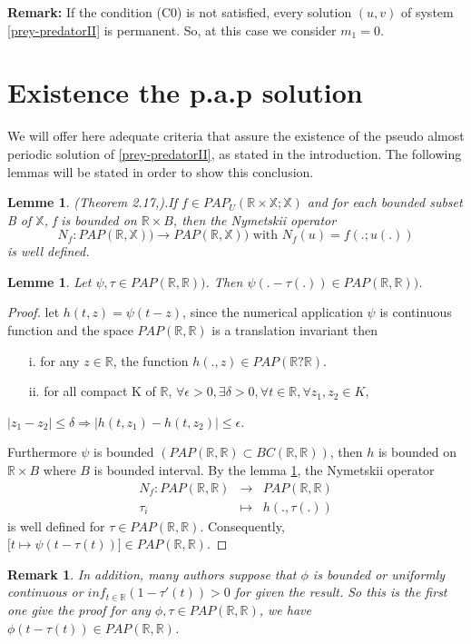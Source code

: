 \documentclass[[a4paper,10pt]{article}
\newcommand{\X}{\mathbb{X}}
\newcommand{\R}{\mathbb{R}}
\newtheorem{lemma}[theorem]{Lemme}%
\newtheorem{remark}[theorem]{Remark}%
\begin{document}
\textbf{Remark:} If the condition (C0) is not satisfied, every solution $(u,v)$ of system \eqref{prey-predatorII} is permanent. So, at this case we consider $m_1=0.$



\section{Existence  the p.a.p solution}
\hspace{1cm} We will offer here adequate criteria that assure the existence  of the pseudo almost periodic solution of \eqref{prey-predatorII}, as stated in the introduction. The following lemmas will be stated in order to show this conclusion.
\begin{lemma} (Theorem 2.17,\cite{cieutat2010composition}).\label{NymetskiiPAP} If $f\in PAP_U(\R\times  \X;\X)$ and for each bounded subset B of $\X$, f is bounded
on $\R\times B$, then the Nymetskii operator
$$N_f : PAP(\R,\X) )\rightarrow PAP(\R,\X)) \text{ with }N_f (u) = f(.; u(.))$$
is well defined.
\end{lemma}
\begin{lemma}\label{composepap}
 Let $\psi,\tau \in PAP(\R,\R))$.  Then $\psi(.-\tau(.)) \in PAP(\R,\R))$. 
\end{lemma}
\begin{proof}
let  $h(t,z)=\psi(t-z)$,  since the numerical application $\psi$ is continuous function  and the space $PAP(\R,\R)$ is a translation invariant then \begin{enumerate}
\item[i.] for any $z\in \R$, the function $h(.,z) \in PAP(\R? \R)$. 
\item[ ii.] for all compact K of $\R$, $\forall \epsilon> 0, \exists \delta > 0, \forall t \in \mathbb{R}, \forall z_1, z_2 \in K$,\end{enumerate}
\begin{center}
$|z_1 - z_2| \leq \delta \Rightarrow  |h(t, z_1) - h(t, z_2)| \leq \epsilon$.
\end{center}
Furthermore $\psi$ is bounded $(PAP(\R,\R)\subset BC(\R,\R))$, then $h$ is bounded on $\R\times B $ where $B$ is bounded interval. 
By the lemma \ref{NymetskiiPAP}, the Nymetskii operator
\begin{eqnarray*}
 N_f : PAP(\R,\R)&\longrightarrow & PAP(\R,\R)
 \\\tau_i &\longmapsto &h(.,\tau(.))\end{eqnarray*}
is well defined for ${\displaystyle \tau \in  PAP(\R,\mathbb{R})}$. Consequently, ${\displaystyle \bigg[t\longmapsto\psi(t-\tau(t))\bigg]\in  PAP(\R,\mathbb{R})}.$
\end{proof}
\begin{remark}
In addition, many authors suppose that $\phi$ is bounded or uniformly continuous or $inf_{t\in \R}(1-\tau'(t))>0$ for given the result. So this is the first one give the proof for any $\phi,\tau \in PAP(\R,\R)$, we have $\phi(t-\tau(t))\in PAP(\R,\R)$.
\end{remark}
\end{document}
